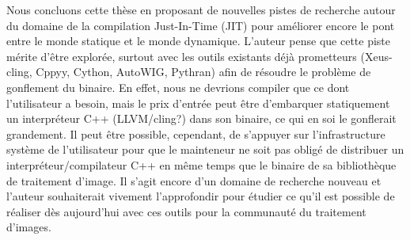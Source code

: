 Nous concluons cette thèse en proposant de nouvelles pistes de recherche autour du domaine de la compilation
Just-In-Time (JIT) pour améliorer encore le pont entre le monde statique et le monde dynamique. L'auteur pense que cette
piste mérite d'être explorée, surtout avec les outils existants déjà prometteurs (Xeus-cling, Cppyy, Cython, AutoWIG,
Pythran) afin de résoudre le problème de gonflement du binaire. En effet, nous ne devrions compiler que ce dont
l'utilisateur a besoin, mais le prix d'entrée peut être d'embarquer statiquement un interpréteur C++ (LLVM/cling?) dans
son binaire, ce qui en soi le gonflerait grandement. Il peut être possible, cependant, de s'appuyer sur l'infrastructure
système de l'utilisateur pour que le mainteneur ne soit pas obligé de distribuer un interpréteur/compilateur C++ en même
temps que le binaire de sa bibliothèque de traitement d'image. Il s'agit encore d'un domaine de recherche nouveau et
l'auteur souhaiterait vivement l'approfondir pour étudier ce qu'il est possible de réaliser dès aujourd'hui avec ces
outils pour la communauté du traitement d'images.
